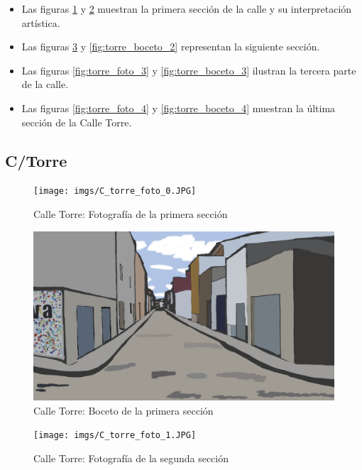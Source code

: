 \documentclass[12pt]{article}
\begin{document}
    \begin{itemize}
        \item Las figuras \ref{fig:torre_foto_1} y \ref{fig:torre_boceto_1} muestran la primera sección de la calle y su interpretación artística.
        \item Las figuras \ref{fig:torre_foto_2} y \ref{fig:torre_boceto_2} representan la siguiente sección.
        \item Las figuras \ref{fig:torre_foto_3} y \ref{fig:torre_boceto_3} ilustran la tercera parte de la calle.
        \item Las figuras \ref{fig:torre_foto_4} y \ref{fig:torre_boceto_4} muestran la última sección de la Calle Torre.
    \end{itemize}

    \clearpage
    \subsection{C/Torre}
    \begin{figure}[h!]
        \centering
        \texttt{[image: imgs/C\_torre\_foto\_0.JPG]}
        \caption{Calle Torre: Fotografía de la primera sección}
        \label{fig:torre_foto_1}
    \end{figure}

    \begin{figure}[h!]
        \centering
        \includegraphics[width=\textwidth]{imgs/c_torre_1.png}
        \caption{Calle Torre: Boceto de la primera sección}
        \label{fig:torre_boceto_1}
    \end{figure}
    \clearpage
    \begin{figure}[h!]
        \centering
        \texttt{[image: imgs/C\_torre\_foto\_1.JPG]}
        \caption{Calle Torre: Fotografía de la segunda sección}
        \label{fig:torre_foto_2}
    \end{figure}
\end{document}
